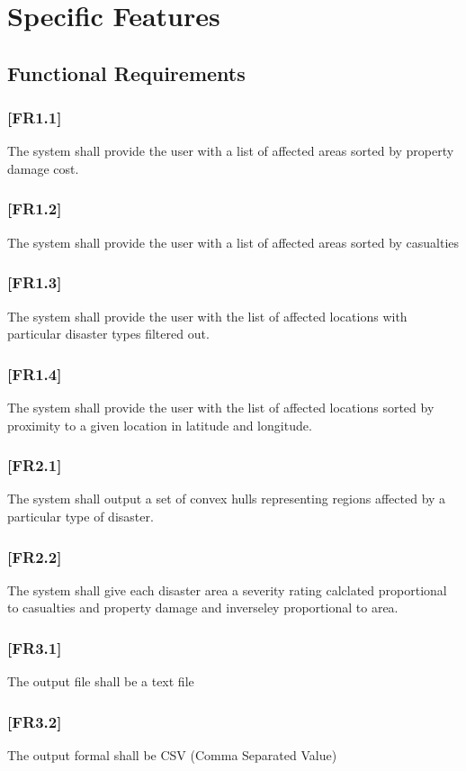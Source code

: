 \documentclass{article}
\begin{document}
 
\section{Specific Features}

\subsection{Functional Requirements}
        \subsubsection*{[FR1.1]} The system shall provide the user with a list of affected areas sorted by property damage cost.
        \subsubsection*{[FR1.2]} The system shall provide the user with a list of affected areas sorted by casualties
        \subsubsection*{[FR1.3]} The system shall provide the user with the list of affected locations with particular disaster types filtered out.
        \subsubsection*{[FR1.4]} The system shall provide the user with the list of affected locations sorted by proximity to a given location in latitude and longitude.
        \subsubsection*{[FR2.1]} The system shall output a set of convex hulls representing regions affected by a particular type of disaster.
        \subsubsection*{[FR2.2]} The system shall give each disaster area a severity rating calclated proportional to casualties and property damage and inverseley proportional to area.
        \subsubsection*{[FR3.1]} The output file shall be a text file
        \subsubsection*{[FR3.2]} The output formal shall be CSV (Comma Separated Value)
\end{document}
